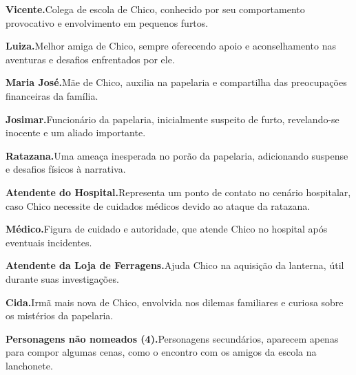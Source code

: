\medskip\noindent \textbf{Vicente.}\quad Colega de escola de Chico, conhecido por seu comportamento provocativo e envolvimento em pequenos furtos.

\medskip\noindent \textbf{Luiza.}\quad Melhor amiga de Chico, sempre oferecendo apoio e aconselhamento nas aventuras e desafios enfrentados por ele.

\medskip\noindent \textbf{Maria José.}\quad Mãe de Chico, auxilia na papelaria e compartilha das preocupações financeiras da família.

\medskip\noindent \textbf{Josimar.}\quad Funcionário da papelaria, inicialmente suspeito de furto, revelando-se inocente e um aliado importante.

\medskip\noindent \textbf{Ratazana.}\quad Uma ameaça inesperada no porão da papelaria, adicionando suspense e desafios físicos à narrativa.

\medskip\noindent \textbf{Atendente do Hospital.}\quad Representa um ponto de contato no cenário hospitalar, caso Chico necessite de cuidados médicos devido ao ataque da ratazana.

\medskip\noindent \textbf{Médico.}\quad Figura de cuidado e autoridade, que atende Chico no hospital após eventuais incidentes.

\medskip\noindent \textbf{Atendente da Loja de Ferragens.}\quad Ajuda Chico na aquisição da lanterna, útil durante suas investigações.

\medskip\noindent \textbf{Cida.}\quad Irmã mais nova de Chico, envolvida nos dilemas familiares e curiosa sobre os mistérios da papelaria.

\medskip\noindent \textbf{Personagens não nomeados (4).}\quad Personagens secundários, aparecem apenas para compor algumas cenas, como o encontro com os amigos da escola na lanchonete.



